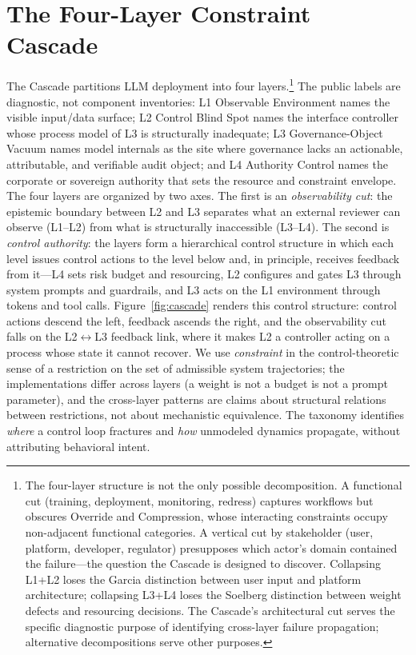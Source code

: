\section{The Four-Layer Constraint Cascade}\label{sec:cascade}

The Cascade partitions LLM deployment into four layers.\footnote{The four-layer structure is not the only possible decomposition. A functional cut (training, deployment, monitoring, redress) captures workflows but obscures Override and Compression, whose interacting constraints occupy non-adjacent functional categories. A vertical cut by stakeholder (user, platform, developer, regulator) presupposes which actor's domain contained the failure---the question the Cascade is designed to discover. Collapsing L1+L2 loses the Garcia distinction between user input and platform architecture; collapsing L3+L4 loses the Soelberg distinction between weight defects and resourcing decisions. The Cascade's architectural cut serves the specific diagnostic purpose of identifying cross-layer failure propagation; alternative decompositions serve other purposes.} The public labels are diagnostic, not component inventories: L1 Observable Environment names the visible input/data surface; L2 Control Blind Spot names the interface controller whose process model of L3 is structurally inadequate; L3 Governance-Object Vacuum names model internals as the site where governance lacks an actionable, attributable, and verifiable audit object; and L4 Authority Control names the corporate or sovereign authority that sets the resource and constraint envelope. The four layers are organized by two axes. The first is an \emph{observability cut}: the epistemic boundary between L2 and L3 separates what an external reviewer can observe (L1--L2) from what is structurally inaccessible (L3--L4). The second is \emph{control authority}: the layers form a hierarchical control structure in which each level issues control actions to the level below and, in principle, receives feedback from it---L4 sets risk budget and resourcing, L2 configures and gates L3 through system prompts and guardrails, and L3 acts on the L1 environment through tokens and tool calls. Figure~\ref{fig:cascade} renders this control structure: control actions descend the left, feedback ascends the right, and the observability cut falls on the L2$\leftrightarrow$L3 feedback link, where it makes L2 a controller acting on a process whose state it cannot recover. We use \textit{constraint} in the control-theoretic sense of a restriction on the set of admissible system trajectories; the implementations differ across layers (a weight is not a budget is not a prompt parameter), and the cross-layer patterns are claims about structural relations between restrictions, not about mechanistic equivalence. The taxonomy identifies \textit{where} a control loop fractures and \textit{how} unmodeled dynamics propagate, without attributing behavioral intent.

